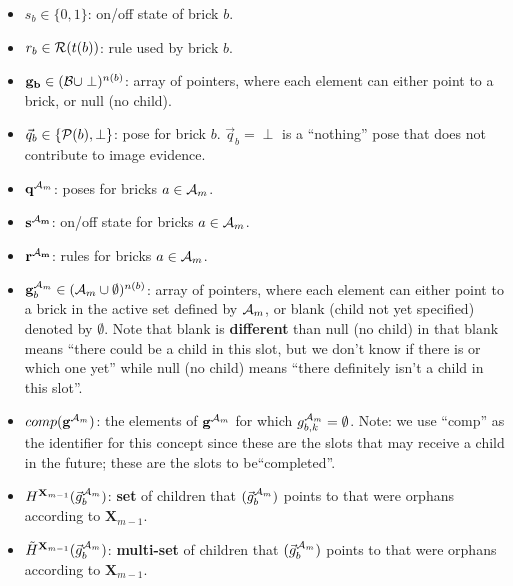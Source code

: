 \documentclass[11pt]{article}
\newcommand{\Pose}{{\cal P}}
\newcommand{\A}{{\cal A}}
\newcommand{\X}{\mathbf{X}}
\newcommand{\B}{\cal B}
\newcommand{\Am}{\A_{m}}
\newcommand{\gcomp}{comp(\mathbf{g}^{\Am})}
\begin{document}
\begin{itemize}

\item $s_b \in \{0,1\}$: on/off state of brick $b$.

\item $r_b \in {\cal R}(t(b))$: rule used by brick $b$.

\item $\mathbf{g_b} \in ( {\B} \cup \perp )^{n(b)}$: array of pointers, where each element can either point to a brick, or null (no child).

\item $\vec{q}_b \in \{\Pose(b), \perp\}$: pose for brick $b$. $\vec{q}_b = \perp$ is a ``nothing'' pose that does not contribute to image evidence.

\item $\mathbf{q}^{\Am}$: poses for bricks $a \in \Am$.

\item $\mathbf{s^{\Am}}$: on/off state for bricks $a \in \Am$.

\item $\mathbf{r^{\Am}}$: rules for bricks $a \in \Am$.

\item $\mathbf{g}_b^{\Am} \in ( {\Am} \cup \emptyset )^{n(b)}$: array of pointers, where each element can either point to a brick in the active set defined by $\Am$, or blank (child not yet specified) denoted by $\emptyset$. Note that blank is \textbf{different} than null (no child) in that blank means ``there could be a child in this slot, but we don't know if there is or which one yet'' while null (no child) means ``there definitely isn't a child in this slot''.

\item $\gcomp$: the elements of $\mathbf{g}^{\Am}$ for which $g_{b,k}^{\Am} = \emptyset$. Note: we use ``comp'' as the identifier for this concept since these are the slots that may receive a child in the future; these are the slots to be``completed''.

\item $H^{\X_{m-1}} (\vec{g}^{\Am}_b)$: \textbf{set} of children that $(\vec{g}^{\Am}_b)$ points to that were orphans according to $\X_{m-1}$.

\item $\tilde{H}^{\X_{m-1}} (\vec{g}^{\Am}_b)$: \textbf{multi-set} of children that $(\vec{g}^{\Am}_b)$ points to that were orphans according to $\X_{m-1}$.


\end{itemize}
\end{document}
